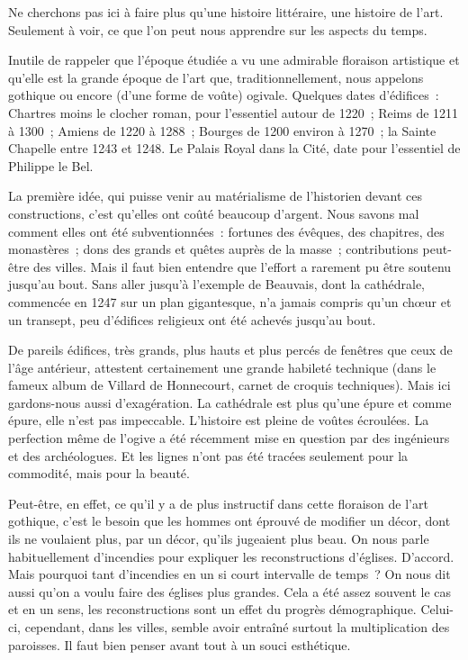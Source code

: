 \documentclass[french,twoside]{book} %
\begin{document}
\bigbreak
\noindent Ne cherchons pas ici à faire plus qu’une histoire littéraire, une histoire de l’art. Seulement à voir, ce que l’on peut nous apprendre sur les aspects du temps.\par
Inutile de rappeler que l’époque étudiée a vu une admirable floraison artistique et qu’elle est la grande époque de l’art que, traditionnellement, nous appelons gothique ou encore (d’une forme de voûte) ogivale. Quelques dates d’édifices : Chartres moins le clocher roman, pour l’essentiel autour de 1220 ; Reims de 1211 à 1300 ; Amiens de 1220 à 1288 ; Bourges de 1200 environ à 1270 ; la Sainte Chapelle entre 1243 et 1248. Le Palais Royal dans la Cité, date pour l’essentiel de Philippe le Bel.\par
La première idée, qui puisse venir au matérialisme de l’historien devant ces constructions, c’est qu’elles ont coûté beaucoup d’argent. Nous savons mal comment elles ont été subventionnées : fortunes des évêques, des chapitres, des monastères ; dons des grands et quêtes auprès de la masse ; contributions peut-être des villes. Mais il faut bien entendre que l’effort a rarement pu être soutenu jusqu’au bout. Sans aller jusqu’à l’exemple de Beauvais, dont la cathédrale, commencée en 1247 sur un plan gigantesque, n’a jamais compris qu’un chœur et un transept, peu d’édifices religieux ont été achevés jusqu’au bout.\par
De pareils édifices, très grands, plus hauts et plus percés de fenêtres que ceux de l’âge antérieur, attestent certainement une grande habileté technique (dans le fameux album de Villard de Honnecourt, carnet de croquis techniques). Mais ici gardons-nous aussi d’exagération. La cathédrale est plus qu’une épure et comme  
\label{p124} épure, elle n’est pas impeccable. L’histoire est pleine de voûtes écroulées. La perfection même de l’ogive a été récemment mise en question par des ingénieurs et des archéologues. Et les lignes n’ont pas été tracées seulement pour la commodité, mais pour la beauté.\par
Peut-être, en effet, ce qu’il y a de plus instructif dans cette floraison de l’art gothique, c’est le besoin que les hommes ont éprouvé de modifier un décor, dont ils ne voulaient plus, par un décor, qu’ils jugeaient plus beau. On nous parle habituellement d’incendies pour expliquer les reconstructions d’églises. D’accord. Mais pourquoi tant d’incendies en un si court intervalle de temps ? On nous dit aussi qu’on a voulu faire des églises plus grandes. Cela a été assez souvent le cas et en un sens, les reconstructions sont un effet du progrès démographique. Celui-ci, cependant, dans les villes, semble avoir entraîné surtout la multiplication des paroisses. Il faut bien penser avant tout à un souci esthétique.\par
\end{document}
